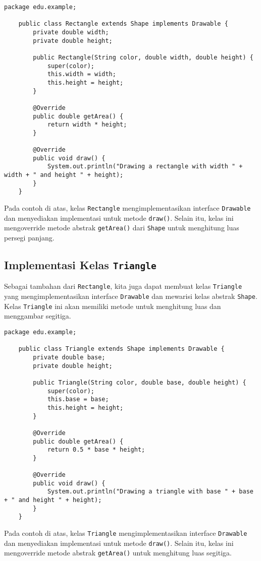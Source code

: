 \begin{lstlisting}[style=JavaStyle]
	package edu.example;
	
	public class Rectangle extends Shape implements Drawable {
		private double width;
		private double height;
		
		public Rectangle(String color, double width, double height) {
			super(color);
			this.width = width;
			this.height = height;
		}
		
		@Override
		public double getArea() {
			return width * height;
		}
		
		@Override
		public void draw() {
			System.out.println("Drawing a rectangle with width " + width + " and height " + height);
		}
	}
\end{lstlisting}

Pada contoh di atas, kelas \texttt{Rectangle} mengimplementasikan interface \texttt{Drawable} dan menyediakan implementasi untuk metode \texttt{draw()}. Selain itu, kelas ini mengoverride metode abstrak \texttt{getArea()} dari \texttt{Shape} untuk menghitung luas persegi panjang.

\subsection{Implementasi Kelas \texttt{Triangle}}

Sebagai tambahan dari \texttt{Rectangle}, kita juga dapat membuat kelas \texttt{Triangle} yang mengimplementasikan interface \texttt{Drawable} dan mewarisi kelas abstrak \texttt{Shape}. Kelas \texttt{Triangle} ini akan memiliki metode untuk menghitung luas dan menggambar segitiga.

\begin{lstlisting}[style=JavaStyle]
	package edu.example;
	
	public class Triangle extends Shape implements Drawable {
		private double base;
		private double height;
		
		public Triangle(String color, double base, double height) {
			super(color);
			this.base = base;
			this.height = height;
		}
		
		@Override
		public double getArea() {
			return 0.5 * base * height;
		}
		
		@Override
		public void draw() {
			System.out.println("Drawing a triangle with base " + base + " and height " + height);
		}
	}
\end{lstlisting}

Pada contoh di atas, kelas \texttt{Triangle} mengimplementasikan interface \texttt{Drawable} dan menyediakan implementasi untuk metode \texttt{draw()}. Selain itu, kelas ini mengoverride metode abstrak \texttt{getArea()} untuk menghitung luas segitiga.

